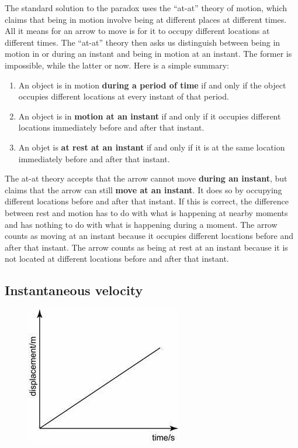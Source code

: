 \documentclass[oneside]{article}
\begin{document}
The standard solution to the paradox uses the ``at-at'' theory of
motion, which claims that being in motion involve being at different places at different times. All it means for an arrow to move is for it to occupy different locations at different times. The ``at-at'' theory then asks us distinguish between being in motion in or during an instant and   being in motion at an instant. The former is impossible, while the latter or now. Here is a simple summary: 
\begin{enumerate}
\item An object is in motion \textbf{during a period of time} if and only if the object occupies different locations at every instant of that period.
\item An object is in \textbf{motion at an instant} if and only if it occupies different locations immediately before and after that instant. 
\item An objet is \textbf{at rest at an instant} if and only if it is at the same location immediately before and after that instant. 
\end{enumerate}

The at-at theory accepts that the arrow cannot move \textbf{during an instant}, but claims that the arrow can still \textbf{move at an instant}. It does so by occupying different locations before and after that instant. If this is correct, the difference between rest and motion has to do with what is happening at nearby moments and has nothing to do with what is happening during a moment. The arrow counts as moving at an instant because it occupies different locations before and after that instant. The arrow counts as being at rest at an instant because it is not located at different locations before and after that instant.

\subsection{Instantaneous velocity}

\begin{figure}[h]
  \includegraphics[width=\linewidth]{graph.jpg}
\end{figure}
\end{document}
